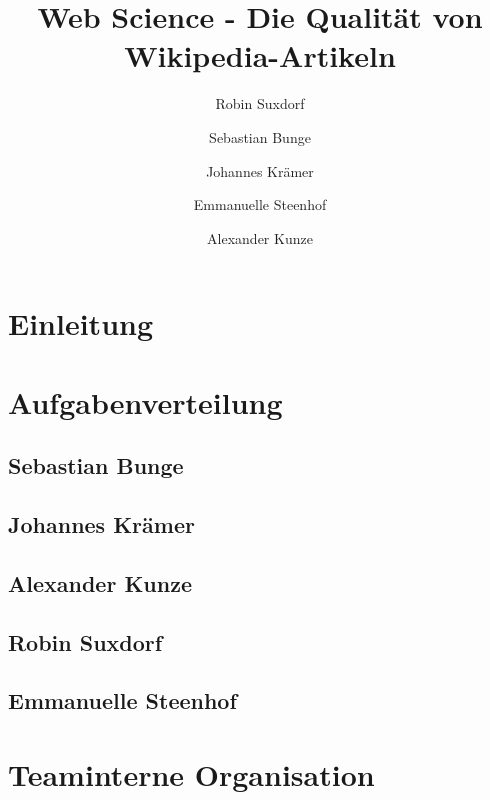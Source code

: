 \documentclass[researchlab,palatino]{AIGpaper}
\author{Robin Suxdorf \and Sebastian Bunge \and Johannes Krämer \and Emmanuelle Steenhof \and Alexander Kunze}
\title{Web Science - Die Qualität von Wikipedia-Artikeln}
\begin{document}
\maketitle %


\section{Einleitung}


\section{Aufgabenverteilung}
\label{Aufgabenverteilung}


\subsection{Sebastian Bunge}
\label{sec:Sebastian}


\subsection{Johannes Krämer}


\subsection{Alexander Kunze}


\subsection{Robin Suxdorf}


\subsection{Emmanuelle Steenhof}


\section{Teaminterne Organisation}
\label{Organisation}

\end{document}
